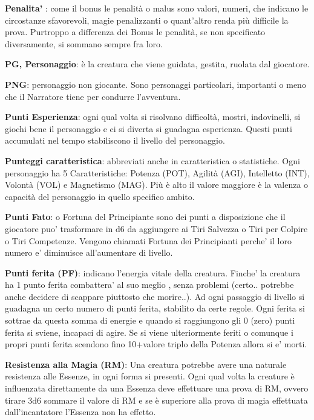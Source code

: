 \documentclass[a4paper,11pt,twoside,openany]{book}
\begin{document}
\textbf{Penalita'} : come il bonus le penalità o malus sono valori, numeri, che indicano le circostanze sfavorevoli, magie penalizzanti o quant'altro renda più difficile la prova. Purtroppo a differenza dei Bonus le penalità, se non specificato diversamente, si sommano sempre fra loro.

\textbf{PG, Personaggio}: è la creatura che viene guidata, gestita, ruolata dal giocatore.

\textbf{PNG}: personaggio non giocante. Sono personaggi particolari, importanti o meno che il Narratore tiene per condurre l'avventura.

\textbf{Punti Esperienza}:   ogni qual volta si risolvano difficoltà, mostri, indovinelli, si giochi bene il personaggio e ci si diverta si guadagna esperienza. Questi punti accumulati nel tempo stabiliscono il livello del personaggio.

\textbf{Punteggi caratteristica}:   abbreviati anche in caratteristica o statistiche. Ogni personaggio ha 5 Caratteristiche: Potenza (POT), Agilità (AGI), Intelletto (INT), Volontà (VOL) e Magnetismo (MAG). Più è alto il valore maggiore è la valenza o capacità del personaggio in quello specifico ambito.

\textbf{Punti Fato}: o Fortuna del Principiante sono dei punti a disposizione che il giocatore puo’ trasformare in d6 da aggiungere ai Tiri Salvezza o Tiri per Colpire o Tiri Competenze. Vengono chiamati Fortuna dei Principianti perche’ il loro numero e’ diminuisce all’aumentare di livello.

\textbf{Punti ferita (PF)}: indicano l’energia vitale della creatura. Finche’ la creatura ha 1 punto ferita combattera’ al suo meglio , senza problemi (certo.. potrebbe anche decidere di scappare piuttosto che morire..).
Ad ogni passaggio di livello si guadagna un certo numero di punti ferita, stabilito da certe regole. Ogni ferita si sottrae da questa somma di energie e quando si raggiungono gli 0 (zero) punti ferita si sviene, incapaci di agire. Se si viene ulteriormente feriti o comunque i propri punti ferita scendono fino 10+valore triplo della Potenza allora si e’ morti.

\textbf{Resistenza alla Magia (RM)}: Una creatura potrebbe avere una naturale resistenza alle Essenze, in ogni forma si presenti. Ogni qual volta la creature è influenzata direttamente da una Essenza deve effettuare una prova di RM, ovvero tirare 3d6 sommare il valore di RM e se è superiore alla prova di magia effettuata dall'incantatore l'Essenza non ha effetto.
\end{document}
